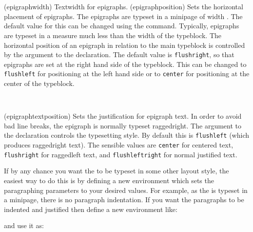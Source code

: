 \begin{syntax}
  \lnc{\epigraphwidth} \\
 \cmd{\epigraphposition} \\
\end{syntax}
\glossary(epigraphwidth)%
  {}%
  {Textwidth for epigraphs.}
\glossary(epigraphposition)%
  {}%
  {Sets the horizontal placement of epigraphs.}
  The epigraphs are typeset in a minipage of width \lnc{\epigraphwidth}. 
The default value for this can be changed using the \cmd{\setlength} command. 
Typically,  epigraphs are typeset in a measure much less than the width of 
the typeblock. The horizontal position of an epigraph
in relation to the main typeblock is controlled by 
the  argument to the \cmd{\epigraphposition} declaration.
The default value is \texttt{flushright}, so that epigraphs are set
at the right hand side of the typeblock. This can be changed
to \texttt{flushleft} for positioning at the left hand side or to
\texttt{center} for positioning at the center of the 
typeblock.

\begin{syntax}
\cmd{\epigraphtextposition} \\
\end{syntax}
\glossary(epigraphtextposition)%
  {}
  {Sets the justification for epigraph text.}
 In order to avoid bad line breaks, the epigraph  is normally 
typeset raggedright. 
    The  argument to the \cmd{\epigraphtextposition} 
declaration controls the  typesetting style. By default this is 
\texttt{flushleft} (which produces raggedright text). The sensible values
are \texttt{center} for centered text, \texttt{flushright} for raggedleft
text, and \texttt{flushleftright} for normal justified text.

    If by any chance you want the  to be typeset in some
other layout style, the easiest
way to do this is by defining a new environment which sets the paragraphing
parameters to your desired values. For example, as the  is
typeset in a minipage, there is no paragraph indentation. If you
want the paragraphs to be indented and justified then define
a new environment like:
\begin{lcode}
\newenvironment{myparastyle}{\setlength{\parindent}{1em}}{}
\end{lcode}
 and use it as: 
\begin{lcode}
\end{lcode}

